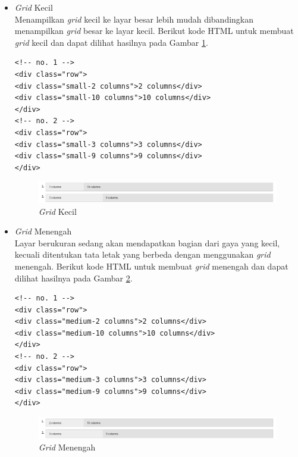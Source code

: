 \begin{enumerate}[(1)]
\begin{itemize}
\item {\it Grid} Kecil\\
Menampilkan {\it grid} kecil ke layar besar lebih mudah dibandingkan menampilkan {\it grid} besar ke layar kecil. Berikut kode HTML untuk membuat {\it grid} kecil dan dapat dilihat hasilnya pada Gambar \ref{fig:gridkecil}.
\begin{lstlisting}[basicstyle=\footnotesize]
<!-- no. 1 -->
<div class="row">
<div class="small-2 columns">2 columns</div>
<div class="small-10 columns">10 columns</div>
</div>
<!-- no. 2 -->
<div class="row">
<div class="small-3 columns">3 columns</div>
<div class="small-9 columns">9 columns</div>
</div>
\end{lstlisting}
\begin{figure}[H]
\centering
\includegraphics[scale=0.6]{Gambar/gridkecil.png}
\caption[{\it Grid} Kecil]{{\it Grid} Kecil}
\label{fig:gridkecil}
\end{figure}
\item {\it Grid} Menengah\\
Layar berukuran sedang akan mendapatkan bagian dari gaya yang kecil, kecuali ditentukan tata letak yang berbeda dengan menggunakan {\it grid} menengah. Berikut kode HTML untuk membuat {\it grid} menengah dan dapat dilihat hasilnya pada Gambar \ref{fig:gridmenengah}.
\begin{lstlisting}[basicstyle=\footnotesize]
<!-- no. 1 -->
<div class="row">
<div class="medium-2 columns">2 columns</div>
<div class="medium-10 columns">10 columns</div>
</div>
<!-- no. 2 -->
<div class="row">
<div class="medium-3 columns">3 columns</div>
<div class="medium-9 columns">9 columns</div>
</div>
\end{lstlisting}
\begin{figure}[H]
\centering
\includegraphics[scale=0.6]{Gambar/gridmenengah.png}
\caption[{\it Grid} Menengah]{{\it Grid} Menengah}
\label{fig:gridmenengah}
\end{figure}


\end{itemize}
\end{enumerate}
